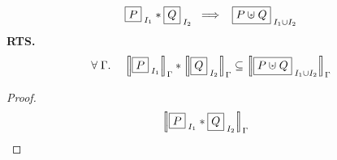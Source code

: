 %	
%	
%	
%	
%	
%	
%	
%	
\begin{lemma}[Merge]
%
\[
	\shared{P}{I_1} * \shared{Q}{I_2} \;\implies\;\; \shared{P \sepish Q}{I_1 \cup I_2}
\]
%
\textbf{RTS.} 
\[
\begin{array}{l l}
	\for{\lenv} &
	  \sem[\lenv]{\shared{P}{I_1}} * \sem[\lenv]{\shared{Q}{I_2}} \subseteq  \sem[\lenv]{\shared{P \sepish Q}{I_1 \cup I_2}}
\end{array}
\]
%
\begin{proof}
\[
\begin{array}{r l}
	\sem[\lenv]{\shared{P}{I_1} * \shared{Q}{I_2}} &
%			

\end{array}\]
\end{proof}
\end{lemma}
